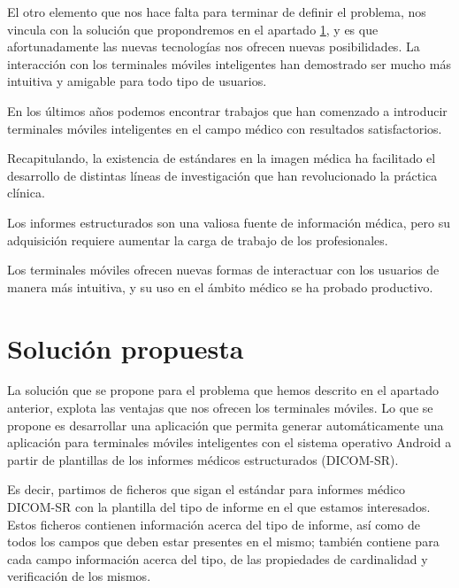 El otro elemento que nos hace falta para terminar de definir el problema, nos vincula con la solución que propondremos en el apartado \ref{solucion}, y es que afortunadamente las nuevas tecnologías nos ofrecen nuevas posibilidades. La interacción con los terminales móviles inteligentes han demostrado ser mucho más intuitiva y amigable para todo tipo de usuarios.\par
En los últimos años podemos encontrar trabajos que han comenzado a introducir terminales móviles inteligentes en el campo médico con resultados satisfactorios. \cite{journals/jdi/ChoudhriR11,20359897,journals/jdi/TangLLC04}\bigskip\par

Recapitulando, la existencia de estándares en la imagen médica ha facilitado el desarrollo de distintas líneas de investigación que han revolucionado la práctica clínica. \par
Los informes estructurados son una valiosa fuente de información médica, pero su adquisición requiere aumentar la carga de trabajo de los profesionales. \par
Los terminales móviles ofrecen nuevas formas de interactuar con los usuarios de manera más intuitiva, y su uso en el ámbito médico se ha probado productivo. \par


\section{Solución propuesta}\label{solucion}
La solución que se propone para el problema que hemos descrito en el apartado anterior, explota las ventajas que nos ofrecen los terminales móviles. Lo que se propone es desarrollar una aplicación que permita generar automáticamente una aplicación para terminales móviles inteligentes con el sistema operativo Android a partir de plantillas de los informes médicos estructurados (DICOM-SR).\medskip\par

Es decir, partimos de ficheros que sigan el estándar para informes médico DICOM-SR con la plantilla del tipo de informe en el que estamos interesados. Estos ficheros contienen información  acerca del tipo de informe, así como de todos los campos que deben estar presentes en el mismo; también contiene para cada campo información acerca del tipo, de las propiedades de cardinalidad y verificación de los mismos.\par

